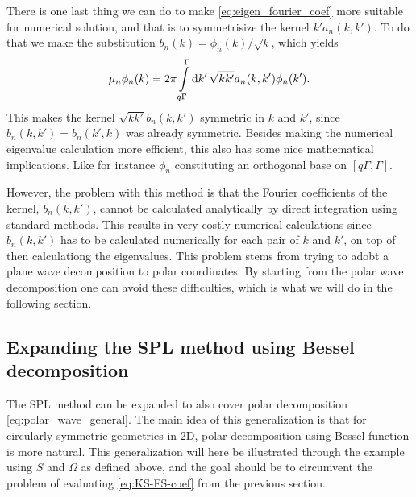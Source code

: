 \documentclass[11pt,a4paper, 
swedish,english %
]{article}
\begin{document}
There is one last thing we can do to make
\eqref{eq:eigen_fourier_coef} more suitable for numerical solution,
and that is to symmetrisize the kernel $k'a_n(k, k')$. To do that we
make the substitution $b_n(k)=\phi_n(k)/\sqrt{k}$, which yields
\begin{equation}
\mu_n \phi_n(k) = 2\pi\int_{q\Gamma}^\Gamma\rd{k'}\,
\sqrt{kk'}a_n(k, k') \phi_n(k').
\end{equation}
This makes the kernel $\sqrt{kk'}b_n(k, k')$ symmetric in $k$ and
$k'$, since $b_n(k, k')=b_n(k', k)$ was already symmetric. Besides
making the numerical eigenvalue calculation more efficient, this also
has some nice mathematical implications. Like for instance $\phi_n$
constituting an orthogonal base on $[q\Gamma, \Gamma]$.

However, the problem with this method is that the Fourier coefficients
of the kernel, $b_n(k, k')$, cannot be calculated analytically by
direct integration using standard methods. This results in very costly
numerical calculations since $b_n(k, k')$ has to be calculated
numerically for each pair of $k$ and $k'$, on top of then calculationg
the eigenvalues. 
This problem stems from trying to adobt a plane wave decomposition to
polar coordinates. By starting from the polar wave decomposition one
can avoid these difficulties, which is what we will do in the
following section. 


\subsection{Expanding the SPL method using Bessel decomposition}
The SPL method can be expanded to also cover polar decomposition
\eqref{eq:polar_wave_general}. The main idea of this generalization is
that for circularly symmetric geometries in 2D, polar decomposition
using Bessel function is more natural. 
This generalization will here be illustrated through the example using
$S$ and $\Omega$ as defined above, and the goal should be to
circumvent the problem of evaluating \eqref{eq:KS-FS-coef} from the
previous section.
\end{document}
